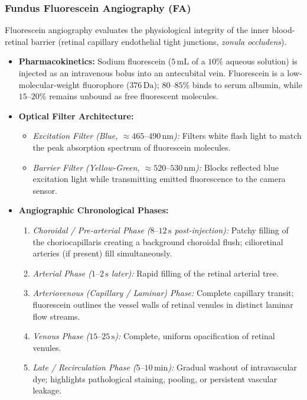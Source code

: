 \documentclass[11pt,a4paper]{article}
\begin{document}
\subsubsection{Fundus Fluorescein Angiography (FA)}
Fluorescein angiography evaluates the physiological integrity of the inner blood-retinal barrier (retinal capillary endothelial tight junctions, \textit{zonula occludens}).
\begin{itemize}[leftmargin=*]
    \item \textbf{Pharmacokinetics:} Sodium fluorescein ($5\,\text{mL}$ of a $10\%$ aqueous solution) is injected as an intravenous bolus into an antecubital vein. Fluorescein is a low-molecular-weight fluorophore ($376\,\text{Da}$); $80\text{--}85\%$ binds to serum albumin, while $15\text{--}20\%$ remains unbound as free fluorescent molecules.
    \item \textbf{Optical Filter Architecture:}
    \begin{itemize}
        \item \textit{Excitation Filter (Blue, $\approx 465\text{--}490\,\text{nm}$):} Filters white flash light to match the peak absorption spectrum of fluorescein molecules.
        \item \textit{Barrier Filter (Yellow-Green, $\approx 520\text{--}530\,\text{nm}$):} Blocks reflected blue excitation light while transmitting emitted fluorescence to the camera sensor.
    \end{itemize}
    \item \textbf{Angiographic Chronological Phases:}
    \begin{enumerate}
        \item \textit{Choroidal / Pre-arterial Phase ($8\text{--}12\,\text{s}$ post-injection):} Patchy filling of the choriocapillaris creating a background choroidal flush; cilioretinal arteries (if present) fill simultaneously.
        \item \textit{Arterial Phase ($1\text{--}2\,\text{s}$ later):} Rapid filling of the retinal arterial tree.
        \item \textit{Arteriovenous (Capillary / Laminar) Phase:} Complete capillary transit; fluorescein outlines the vessel walls of retinal venules in distinct laminar flow streams.
        \item \textit{Venous Phase ($15\text{--}25\,\text{s}$):} Complete, uniform opacification of retinal venules.
        \item \textit{Late / Recirculation Phase ($5\text{--}10\,\text{min}$):} Gradual washout of intravascular dye; highlights pathological staining, pooling, or persistent vascular leakage.
    \end{enumerate}
\end{itemize}
\end{document}
